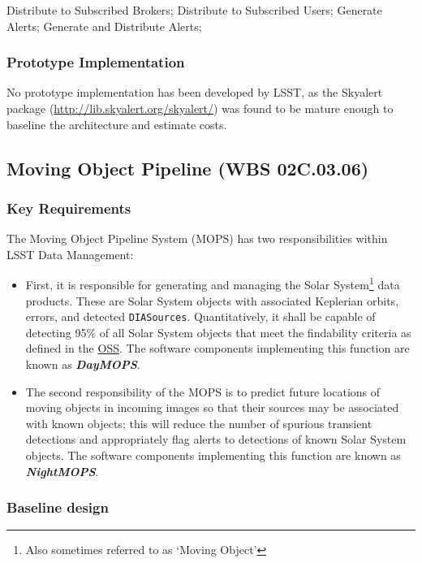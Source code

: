 \documentclass[12pt]{article}
\newcommand{\code}[1]{\texttt{#1}}
\newcommand{\DIASources}{\code{DIASources}\xspace}
\newcommand{\ds}[2]{{\color{blue} \href{https://docushare.lsstcorp.org/docushare/dsweb/Get/#1}{#2}}\xspace}
\newcommand{\OSS}{\ds{LSE-30}{OSS}}
\newcommand{\wbsMOPS}{WBS 02C.03.06}
\begin{document}
Distribute to Subscribed Brokers; Distribute to Subscribed Users; Generate Alerts;
Generate and Distribute Alerts;

\subsubsection{Prototype Implementation}

No prototype implementation has been developed by LSST, as the Skyalert package (\url{http://lib.skyalert.org/skyalert/}) was found to be mature enough to baseline the architecture and estimate costs.

\clearpage

\subsection{Moving Object Pipeline (\wbsMOPS)}

\subsubsection{Key Requirements}

The Moving Object Pipeline System (MOPS) has two responsibilities within LSST Data Management:

\begin{itemize}
    \item First, it is responsible for generating and managing the Solar System\footnote{Also sometimes referred to as `Moving Object'} data products. These are Solar System objects with associated Keplerian orbits, errors, and detected \DIASources. Quantitatively, it shall be capable of detecting 95\% of all Solar System objects that meet the findability criteria as defined in the \OSS\@. The software components implementing this function are known as {\bf \em DayMOPS}.
    \item The second responsibility of the MOPS is to predict future locations of moving objects in incoming images so that their sources may be associated with known objects; this will reduce the number of spurious transient detections and appropriately flag alerts to detections of known Solar System objects.  The software components implementing this function are known as {\bf \em NightMOPS}.
\end{itemize}

\subsubsection{Baseline design}
\end{document}
